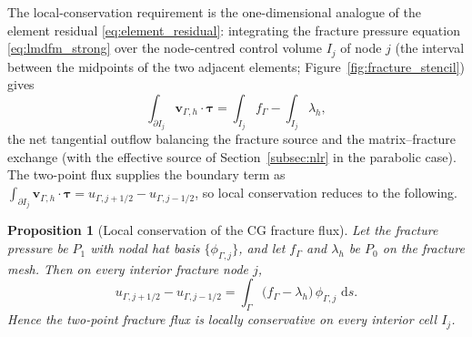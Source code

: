 \documentclass[a4paper,fleqn]{cas-sc}
\newcommand{\dd}{\,\mathrm{d}}
\newcommand{\vflux}{\mathbf{v}}
\newtheorem{proposition}[theorem]{Proposition}
\begin{document}
The local-conservation requirement is the one-dimensional analogue of the element
residual \eqref{eq:element_residual}: integrating the fracture pressure equation
\eqref{eq:lmdfm_strong} over the node-centred control volume \(I_j\) of node \(j\)
(the interval between the midpoints of the two adjacent elements;
Figure~\ref{fig:fracture_stencil}) gives
\begin{equation}
\int_{\partial I_j}\vflux_{\Gamma,h}\cdot\bm\tau
=
\int_{I_j} f_\Gamma - \int_{I_j}\lambda_h ,
\label{eq:fracture_balance}
\end{equation}
the net tangential outflow balancing the fracture source and the matrix--fracture
exchange (with the effective source of Section~\ref{subsec:nlr} in the parabolic
case). The two-point flux supplies the boundary term as
\(\int_{\partial I_j}\vflux_{\Gamma,h}\cdot\bm\tau=u_{\Gamma,j+1/2}-u_{\Gamma,j-1/2}\),
so local conservation reduces to the following.

\begin{proposition}[Local conservation of the CG fracture flux]
\label{prop:fracture-conservation}
Let the fracture pressure be \(P_1\) with nodal hat basis
\(\{\phi_{\Gamma,j}\}\), and let \(f_\Gamma\) and \(\lambda_h\) be \(P_0\)
on the fracture mesh. Then on every interior fracture node \(j\),
\[
  u_{\Gamma,j+1/2}-u_{\Gamma,j-1/2}
  =
  \int_\Gamma\bigl(f_\Gamma-\lambda_h\bigr)\,\phi_{\Gamma,j}\,\dd s .
\]
Hence the two-point fracture flux is locally conservative on every interior cell
\(I_j\).
\end{proposition}
\end{document}
